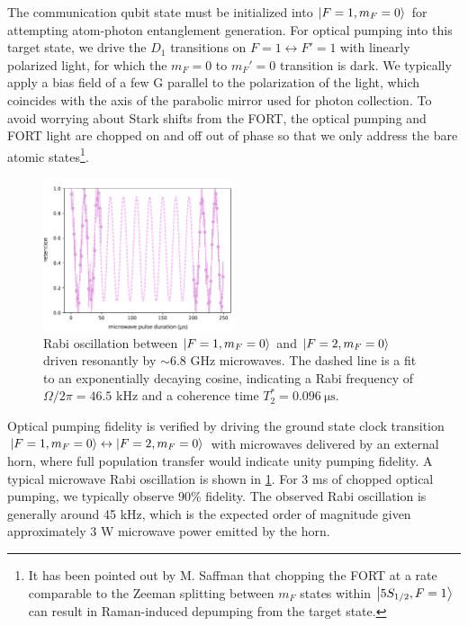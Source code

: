 The communication qubit state must be initialized into $\ket{F=1,m_F=0}$ for attempting
atom-photon entanglement generation. For optical pumping into this target state, we drive the $D_1$ transitions on $F=1 \leftrightarrow F'=1$ with linearly polarized light, for which the $m_F=0$ to $m_F'=0$ transition is dark. We typically apply a bias field of a few G parallel to the polarization of the light, which coincides with the axis of the parabolic mirror used for photon collection. To avoid worrying about Stark shifts from the FORT, the optical pumping and FORT light are chopped on and off out of phase so that we only address the bare atomic states\footnote{It has been pointed out by M. Saffman that chopping the FORT at a rate comparable to the Zeeman splitting between $m_F$ states within $\ket{5S_{1/2},F=1}$ can result in Raman-induced depumping from the target state.}. 
\begin{figure}[!h]
    \centering
    \includegraphics[width=0.5\textwidth]{Images/good_microwave_Rabi_experiment 19212_19211.pdf}
    \caption{Rabi oscillation between $\ket{F=1,m_F=0}$ and $\ket{F=2,m_F=0}$ driven resonantly by $\sim6.8$ GHz microwaves. The dashed line is a fit to an exponentially decaying cosine, indicating a Rabi frequency of $\Omega/2\pi=46.5$ kHz and a coherence time $T_2^*=0.096~\mathrm{\mu} \textrm{s}$.}
    \label{fig:microwave_oscillation}
\end{figure}

Optical pumping fidelity is verified by driving the ground state clock transition $\ket{F=1,m_F=0} \leftrightarrow \ket{F=2,m_F=0}$ with microwaves delivered by an external horn, where full population transfer would indicate unity pumping fidelity. A typical microwave Rabi oscillation is shown in \ref{fig:microwave_oscillation}. For 3 ms of chopped optical pumping, we typically observe 90$\%$ fidelity. The observed Rabi oscillation is generally around 45 kHz, which is the expected order of magnitude given approximately 3 W microwave power emitted by the horn\cite{kwon2019rydberg}.

